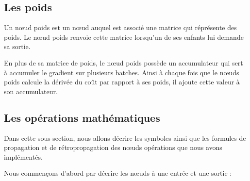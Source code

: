 \subsection{Les poids}

Un n\oe{}ud poids est un n\oe{}ud auquel est associé une matrice qui réprésente des poids. Le n\oe{}ud poids renvoie cette matrice lorsqu'un de ses enfants lui demande sa sortie.

En plus de sa matrice de poids, le n\oe{}ud poids possède un accumulateur qui sert à accumuler le gradient sur plusieurs batches. Ainsi à chaque fois que le n\oe{}uds poids calcule la dérivée du coût par rapport à ses poids, il ajoute cette valeur à son accumulateur.

\subsection{Les opérations mathématiques}

Dans cette sous-section, nous allons décrire les symboles ainsi que les formules de propagation et de rétropropagation des n\oe{}uds opérations que nous avons implémentés. \label{nodes}

Nous commençons d'abord par décrire les n\oe{}uds à une entrée et une sortie :

